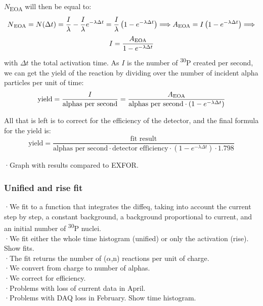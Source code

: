 \documentclass[a4paper,12pt]{report}
\newcommand{\an}{($\alpha$,n) }
\newcommand{\Piso}{\textsuperscript{30}P }
\begin{document}
$N$\textsubscript{EOA} will then be equal to:
\[ N\textsubscript{EOA} =N(\Delta t) = \frac{I}{\lambda} - \frac{I}{\lambda} e^{-\lambda \Delta t} = \frac{I}{\lambda} \left(1 - e^{-\lambda \Delta t} \right)\Longrightarrow A\textsubscript{EOA}=I\left(1-e^{-\lambda\Delta t}\right)\Longrightarrow \]
\begin{equation}
	I = \frac{A\textsubscript{EOA}}{1 - e^{-\lambda \Delta t}}
\end{equation}
with $\Delta t$ the total activation time.
As $I$ is the number of \Piso created per second, we can get the yield of the reaction by dividing over the number of incident alpha particles per unit of time:
\begin{equation}
	\text{yield} = \frac{I}{\text{alphas per second}} = \frac{A\textsubscript{EOA}}{\text{alphas per second} \cdot \left(1 - e^{-\lambda \Delta t} \right)}
\end{equation}

All that is left is to correct for the efficiency of the detector, and the final formula for the yield is:
\begin{equation}
	\text{yield} = \frac{\text{fit result}}{\text{alphas per second} \cdot \text{detector efficiency} \cdot \left(1 - e^{-\lambda \Delta t} \right) \cdot 1.798}	%
\end{equation}

·Graph with results compared to EXFOR.\\

\subsubsection{Unified and rise fit}
·We fit to a function that integrates the diffeq, taking into account the current step by step, a constant background, a background proportional to current, and an initial number of \Piso nuclei.\\
·We fit either the whole time histogram (unified) or only the activation (rise). Show fits.\\
·The fit returns the number of \an reactions per unit of charge.\\
·We convert from charge to number of alphas.\\
·We correct for efficiency.\\

·Problems with loss of current data in April.\\
·Problems with DAQ loss in February. Show time histogram.\\
\end{document}
